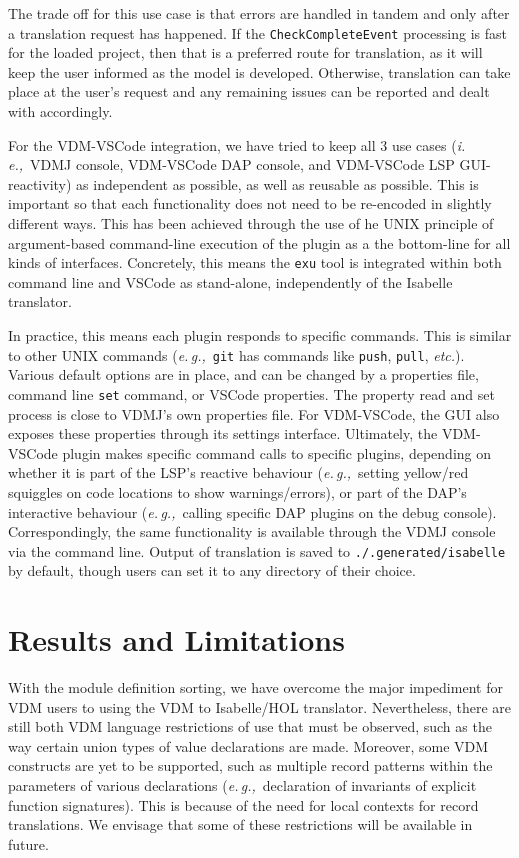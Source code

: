 \documentclass[runningheads,a4paper]{llncs}
\newcommand{\eg}{{\em e.\,g.,\/}}
\newcommand{\ie}{{\em i.\,e.,\/}}
\newcommand{\etc}{{\em etc.\/}}
\begin{document}
The trade off for this use case is that errors are handled in tandem and only after a translation request has happened. If the \texttt{CheckCompleteEvent} processing is fast for the loaded project, then that is a preferred route for translation, as it will keep the user informed as the model is developed. Otherwise, translation can take place at the user's request and any remaining issues can be reported and dealt with accordingly.  

For the VDM-VSCode integration, we have tried to keep all \(3\) use cases (\ie~VDMJ console, VDM-VSCode DAP console, and VDM-VSCode LSP GUI-reactivity) as independent as possible, as well as reusable as possible. This is important so that each functionality does not need to be re-encoded in slightly different ways. This has been achieved through the use of he UNIX principle of argument-based command-line execution of the plugin as a the bottom-line for all kinds of interfaces. Concretely, this means the \texttt{exu} tool is integrated within both command line and VSCode as stand-alone, independently of the Isabelle translator. 

In practice, this means each plugin responds to specific commands. This is similar to other UNIX commands (\eg~\texttt{git} has commands like \texttt{push}, \texttt{pull}, \etc). Various default options are in place, and can be changed by a properties file, command line \texttt{set} command, or VSCode properties. The property read and set process is close to VDMJ's own properties file. For VDM-VSCode, the GUI also exposes these properties through its settings interface. Ultimately, the VDM-VSCode plugin makes specific command calls to specific plugins, depending on whether it is part of the LSP's reactive behaviour  (\eg~setting yellow/red squiggles on code locations to show warnings/errors), or part of the DAP's interactive behaviour (\eg~calling specific DAP plugins on the debug console). Correspondingly, the same functionality is available through the VDMJ console via the command line. Output of translation is saved to \texttt{./.generated/isabelle} by default, though users can set it to any directory of their choice. 

\section{Results and Limitations}\label{sec:Examples}

With the module definition sorting, we have overcome the major impediment for VDM users to using the VDM to Isabelle/HOL translator. Nevertheless, there are still both VDM language restrictions of use that must be observed, such as the way certain union types of value declarations are made. Moreover, some VDM constructs are yet to be supported, such as multiple record patterns within the parameters of various declarations (\eg~declaration of invariants of explicit function signatures). This is because of the need for local contexts for record translations. We envisage that some of these restrictions will be available in future. 
\end{document}
